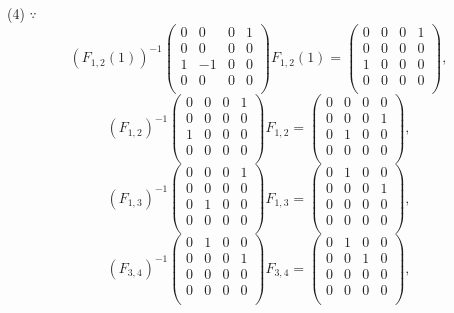 \documentclass{ctexart}
\begin{document}
\begin{solution}
    (4) $\because$
    \[(F_{1,2}(1))^{-1}\begin{pmatrix}
        0 & 0 & 0 & 1 \\
        0 & 0 & 0 & 0 \\
        1 & -1 & 0 & 0 \\
        0 & 0 & 0 & 0 \\
    \end{pmatrix}F_{1,2}(1)=\begin{pmatrix}
        0 & 0 & 0 & 1 \\
        0 & 0 & 0 & 0 \\
        1 & 0 & 0 & 0 \\
        0 & 0 & 0 & 0 \\
    \end{pmatrix},\]
    \[(F_{1,2})^{-1}\begin{pmatrix}
        0 & 0 & 0 & 1 \\
        0 & 0 & 0 & 0 \\
        1 & 0 & 0 & 0 \\
        0 & 0 & 0 & 0 \\
    \end{pmatrix}F_{1,2}=\begin{pmatrix}
        0 & 0 & 0 & 0 \\
        0 & 0 & 0 & 1 \\
        0 & 1 & 0 & 0 \\
        0 & 0 & 0 & 0 \\
    \end{pmatrix},\]
    \[(F_{1,3})^{-1}\begin{pmatrix}
        0 & 0 & 0 & 1 \\
        0 & 0 & 0 & 0 \\
        0 & 1 & 0 & 0 \\
        0 & 0 & 0 & 0 \\
    \end{pmatrix}F_{1,3}=\begin{pmatrix}
        0 & 1 & 0 & 0 \\
        0 & 0 & 0 & 1 \\
        0 & 0 & 0 & 0 \\
        0 & 0 & 0 & 0 \\
    \end{pmatrix},\]
    \[(F_{3,4})^{-1}\begin{pmatrix}
        0 & 1 & 0 & 0 \\
        0 & 0 & 0 & 1 \\
        0 & 0 & 0 & 0 \\
        0 & 0 & 0 & 0 \\
    \end{pmatrix}F_{3,4}=\begin{pmatrix}
        0 & 1 & 0 & 0 \\
        0 & 0 & 1 & 0 \\
        0 & 0 & 0 & 0 \\
        0 & 0 & 0 & 0 \\
    \end{pmatrix},\]


\end{solution}
\end{document}
